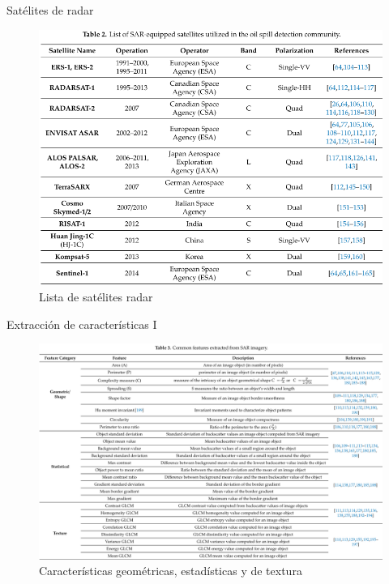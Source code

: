 \begin{frame}{Satélites de radar}
  \begin{figure}
      \centering
      \includegraphics[scale=1.2]{img/section_02/caracteristicas_radar_02.png}
      \caption{Lista de satélites radar}
      \label{fig:optical_features_01}
  \end{figure}
\end{frame}

\begin{frame}{Extracción de características I}
  \begin{figure}
      \centering
      \includegraphics[scale=1.0]{img/section_02/tabla_caracteristicas_01.png}
      \caption{Características geométricas, estadísticas y de textura}
      \label{fig:optical_features_01}
  \end{figure}
\end{frame}

